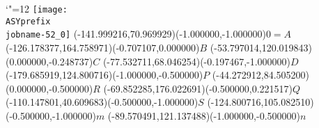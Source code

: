 \setlength{\unitlength}{1pt}%
\makeatletter%
\let\ASYencoding\f@encoding%
\let\ASYfamily\f@family%
\let\ASYseries\f@series%
\let\ASYshape\f@shape%
\makeatother%
{\catcode`"=12%
\texttt{[image: \\ASYprefix\\jobname-52\_0]}%
}%
\color{ASYcolor}%
\fontsize{12.000000}{14.400000}\selectfont%
\usefont{\ASYencoding}{\ASYfamily}{\ASYseries}{\ASYshape}%
\ASYalign(-141.999216,70.969929)(-1.000000,-1.000000){$0=A$}%
\color{ASYcolor}%
\fontsize{12.000000}{14.400000}\selectfont%
\ASYalign(-126.178377,164.758971)(-0.707107,0.000000){$B$}%
\color{ASYcolor}%
\fontsize{12.000000}{14.400000}\selectfont%
\ASYalign(-53.797014,120.019843)(0.000000,-0.248737){$C$}%
\color{ASYcolor}%
\fontsize{12.000000}{14.400000}\selectfont%
\ASYalign(-77.532711,68.046254)(-0.197467,-1.000000){$D$}%
\color{ASYcolor}%
\fontsize{12.000000}{14.400000}\selectfont%
\ASYalign(-179.685919,124.800716)(-1.000000,-0.500000){$P$}%
\color{ASYcolor}%
\fontsize{12.000000}{14.400000}\selectfont%
\ASYalign(-44.272912,84.505200)(0.000000,-0.500000){$R$}%
\color{ASYcolor}%
\fontsize{12.000000}{14.400000}\selectfont%
\ASYalign(-69.852285,176.022691)(-0.500000,0.221517){$Q$}%
\color{ASYcolor}%
\fontsize{12.000000}{14.400000}\selectfont%
\ASYalign(-110.147801,40.609683)(-0.500000,-1.000000){$S$}%
\color{ASYcolor}%
\fontsize{12.000000}{14.400000}\selectfont%
\ASYalign(-124.800716,105.082510)(-0.500000,-1.000000){$m$}%
\color{ASYcolor}%
\fontsize{12.000000}{14.400000}\selectfont%
\ASYalign(-89.570491,121.137488)(-1.000000,-0.500000){$n$}%
